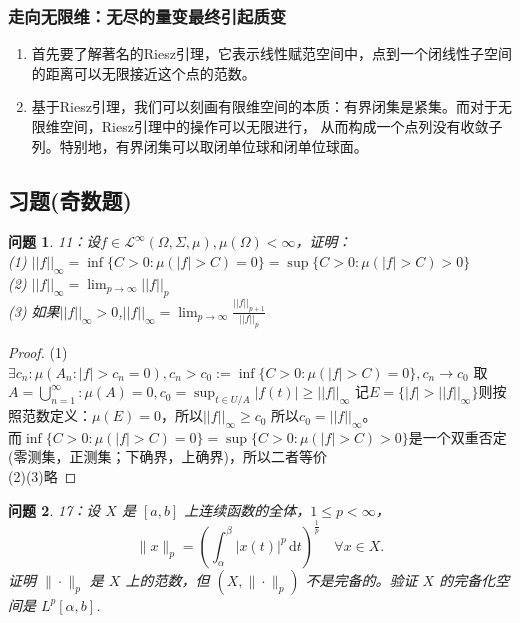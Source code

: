 \documentclass[a4paper, 12pt]{ctexart}
\newtheorem*{theorem}{问题}%
\begin{document}
\subsubsection{走向无限维：无尽的量变最终引起质变}
\begin{enumerate}
    \item 首先要了解著名的Riesz引理，它表示线性赋范空间中，点到一个闭线性子空间的距离可以无限接近这个点的范数。
    \item 基于Riesz引理，我们可以刻画有限维空间的本质：有界闭集是紧集。而对于无限维空间，Riesz引理中的操作可以无限进行，
    从而构成一个点列没有收敛子列。特别地，有界闭集可以取闭单位球和闭单位球面。
\end{enumerate}
\subsection{习题(奇数题)}


\begin{theorem}
11：设$f \in \mathscr{L}^{\infty}(\Omega,\Sigma,\mu),\mu(\Omega)<\infty$，证明：
\\
(1) $||f||_\infty=\inf \{ C>0:\mu(|f|>C)=0 \}=\sup \{ C>0:\mu(|f|>C)>0 \}$
\\
(2) $||f||_\infty=\lim_{p \to \infty} ||f||_p$
\\
(3) 如果$||f||_\infty>0$,$||f||_\infty=\lim_{p \to \infty} \frac{||f||_{p+1}}{||f||_p}$
\end{theorem}

\begin{proof}
(1) 
$\exists c_{n}:\mu(A_{n}:\mid f\mid>c_{n}=0),  c_{n}>c_{0}:=\inf \{ C>0:\mu(|f|>C)=0 \},c_{n} \to c_{0}$
取$A=\bigcup_{n=1}^\infty:\mu(A)=0,c_{0}=\sup_{t\in U/A}\lvert f(t) \rvert\geq \lvert \lvert f \rvert \rvert_{\infty}$
记$E=\{ \lvert f \rvert>\lvert \lvert f \rvert \rvert_{\infty} \}$则按照范数定义：$\mu(E)=0$，所以$\lvert \lvert f \rvert \rvert_{\infty}\geq c_{0}$ 
所以$c_{0}=\lvert \lvert f \rvert \rvert_{\infty}$。
\\
而$\inf \{ C>0:\mu(|f|>C)=0 \}=\sup \{ C>0:\mu(|f|>C)>0 \}$是一个双重否定(零测集，正测集；下确界，上确界)，所以二者等价
\\
(2)(3)略
\end{proof}

\begin{theorem}
17：设 $X$ 是 $[a,b]$ 上连续函数的全体，$1 \leq p < \infty$，
$$
\|x\|_{p}=\left(\int_{\alpha}^{\beta}|x(t)|^{p}\,\mathrm{d}t\right)^{\frac{1}{p}} \quad \forall x \in X.
$$
证明 $\|\cdot\|_{p}$ 是 $X$ 上的范数，但 $(X, \|\cdot\|_{p})$ 不是完备的。验证 $X$ 的完备化空间是 $L^{p}[\alpha,b]$.
\end{theorem}
\end{document}
